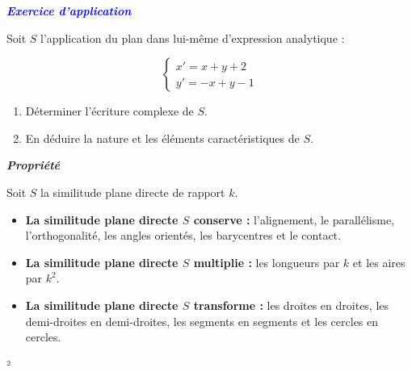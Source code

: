 \documentclass{article}
\begin{document}
\textbf{\textcolor{blue}{\textit{Exercice d’application}}}

\vspace{0.3cm}

Soit \( S \) l’application du plan dans lui-même d’expression analytique :

\[
\begin{cases}
x' = x + y + 2 \\
y' = -x + y - 1
\end{cases}
\]

\begin{enumerate}
    \item Déterminer l’écriture complexe de \( S \).
    
    \item En déduire la nature et les éléments caractéristiques de \( S \).
\end{enumerate}
\textbf{\textit{Propriété}}

\vspace{0.3cm}

Soit \( S \) la similitude plane directe de rapport \( k \).

\begin{itemize}
    \item \textbf{La similitude plane directe \( S \) conserve :} l’alignement, le parallélisme, l’orthogonalité, les angles orientés, les barycentres et le contact.
    
    \item \textbf{La similitude plane directe \( S \) multiplie :} les longueurs par \( k \) et les aires par \( k^2 \).
    
    \item \textbf{La similitude plane directe \( S \) transforme :} les droites en droites, les demi-droites en demi-droites, les segments en segments et les cercles en cercles.
\end{itemize}
²
\end{document}
